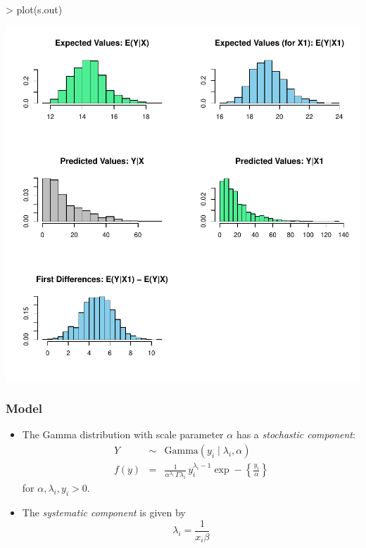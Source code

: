 \begin{center}
\begin{Schunk}
\begin{Sinput}
> plot(s.out)
\end{Sinput}
\end{Schunk}
\includegraphics{vigpics/gamma-ExamplePlot}
\end{center}

\subsubsection{Model}

\begin{itemize}
\item The Gamma distribution with scale parameter $\alpha$ has a
\emph{stochastic component}:
\begin{eqnarray*}
Y &\sim& \textrm{Gamma}(y_i \mid \lambda_i, \alpha) \\
f(y)  &=& \frac{1}{\alpha^{\lambda_i} \, \Gamma \lambda_i} \, y_i^{\lambda_i
  - 1} \exp -\left\{ \frac{y_i}{\alpha} \right\}
\end{eqnarray*}
for $\alpha, \lambda_i, y_i > 0$.  \\

\item The \emph{systematic component} is given by
\begin{equation*}
  \lambda_i = \frac{1}{x_i \beta}
\end{equation*}
\end{itemize}

